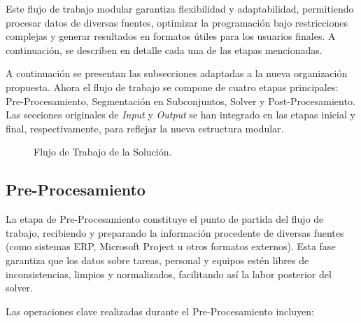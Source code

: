 \documentclass{article}
\begin{document}
Este flujo de trabajo modular garantiza flexibilidad y adaptabilidad, permitiendo procesar datos de diversas fuentes, optimizar la programación bajo restricciones complejas y generar resultados en formatos útiles para los usuarios finales. A continuación, se describen en detalle cada una de las etapas mencionadas.


A continuación se presentan las subsecciones adaptadas a la nueva organización propuesta. Ahora el flujo de trabajo se compone de cuatro etapas principales: Pre-Procesamiento, Segmentación en Subconjuntos, Solver y Post-Procesamiento. Las secciones originales de \textit{Input} y \textit{Output} se han integrado en las etapas inicial y final, respectivamente, para reflejar la nueva estructura modular.


\begin{figure}[htbp]
    \centering
    \caption{Flujo de Trabajo de la Solución.}
    \label{fig:solution}
\end{figure}

\subsection{Pre-Procesamiento}

La etapa de Pre-Procesamiento constituye el punto de partida del flujo de trabajo, recibiendo y preparando la información procedente de diversas fuentes (como sistemas ERP, Microsoft Project u otros formatos externos). Esta fase garantiza que los datos sobre tareas, personal y equipos estén libres de inconsistencias, limpios y normalizados, facilitando así la labor posterior del solver.

Las operaciones clave realizadas durante el Pre-Procesamiento incluyen:
\end{document}
